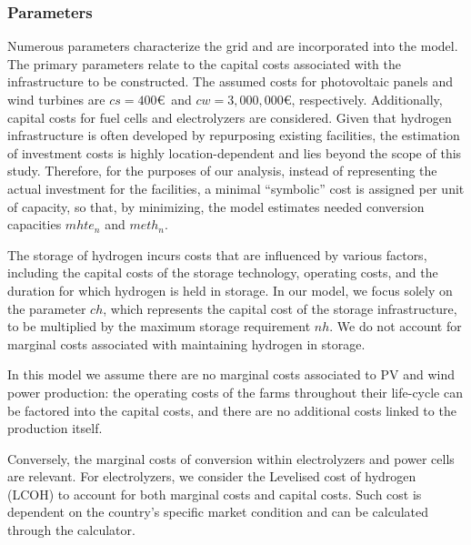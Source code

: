 \documentclass[smallextended,natbib]{svjour3}       %
\numberwithin{definition}{section}
\numberwithin{theorem}{section}
\numberwithin{proposition}{section}
\begin{document}


\subsubsection{Parameters}

Numerous parameters characterize the grid and are incorporated into the model. 
The primary parameters relate to the capital costs associated with the infrastructure to be constructed. 
The assumed costs for photovoltaic panels and wind turbines are $cs=400$\euro\ and $cw=3,000,000$\euro, respectively.
Additionally, capital costs for fuel cells and electrolyzers are considered. 
Given that hydrogen infrastructure is often developed by repurposing existing facilities, the estimation of investment costs is highly location-dependent and lies beyond the scope of this study. 
Therefore, for the purposes of our analysis,  instead of representing the actual investment for the facilities, a minimal ``symbolic'' cost is assigned per unit of capacity, so that, by minimizing, the model estimates needed conversion capacities $mhte_n$ and $meth_n$.

The storage of hydrogen incurs costs that are influenced by various factors, including the capital costs of the storage technology, operating costs, and the duration for which hydrogen is held in storage. 
In our model, we focus solely on the parameter $ch$, which represents the capital cost of the storage infrastructure, to be multiplied by the maximum storage requirement $nh$. 
We do not account for marginal costs associated with maintaining hydrogen in storage.

In this model we assume there are no marginal costs associated to PV and wind power production: the operating costs of the farms throughout their life-cycle can be factored into the capital costs, and there are no additional costs linked to the production itself.

Conversely, the marginal costs of conversion within electrolyzers and power cells are relevant. 
For electrolyzers, we consider the Levelised cost of hydrogen (LCOH) to account for both marginal costs and capital costs. 
Such cost is dependent on the country's specific market condition and can be calculated through the \citet{LCOH} calculator.
\end{document}
